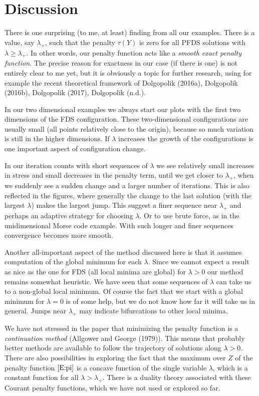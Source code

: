 \documentclass[
  12pt,
]{article}
\begin{document}
\section{Discussion}\label{discussion}

There is one surprising (to me, at least) finding from all our examples.
There is a value, say \(\lambda_+\), such that the penalty \(\tau(Y)\)
is zero for all PFDS solutions with \(\lambda\geq\lambda_+\). In other
words, our penalty function acts like a \emph{smooth exact penalty
function}. The precise reason for exactness in our case (if there is
one) is not entirely clear to me yet, but it is obviously a topic for
further research, using for example the recent theoretical framework of
Dolgopolik (2016a), Dolgopolik (2016b), Dolgopolik (2017), Dolgopolik
(n.d.).

In our two dimensional examples we always start our plots with the first
two dimensions of the FDS configuration. These two-dimensional
configurations are usually small (all points relatively close to the
origin), because so much variation is still in the higher dimensions. If
\(\lambda\) increases the growth of the configurations is one important
aspect of configuration change.

In our iteration counts with short sequences of \(\lambda\) we see
relatively small increases in stress and small decreases in the penalty
term, until we get closer to \(\lambda_+\), when we suddenly see a
sudden change and a larger number of iterations. This is also reflected
in the figures, where generally the change to the last solution (with
the largest \(\lambda\)) makes the largest jump. This suggest a finer
sequence near \(\lambda_+\) and perhaps an adaptive strategy for
choosing \(\lambda\). Or to use brute force, as in the unidimensional
Morse code example. With such longer and finer sequences convergence
becomes more smooth.

Another all-important aspect of the method discussed here is that it
assumes computation of the global minimum for each \(\lambda\). Since we
cannot expect a result as nice as the one for FDS (all local minima are
global) for \(\lambda>0\) our method remains somewhat heuristic. We have
seen that some sequences of \(\lambda\) can take us to a non-global
local minimum. Of course the fact that we start with a global minimum
for \(\lambda=0\) is of some help, but we do not know how far it will
take us in general. Jumps near \(\lambda_+\) may indicate bifurcations
to other local minima.

We have not stressed in the paper that minimizing the penalty function
is a \emph{continuation method} (Allgower and George (1979)). This means
that probably better methods are available to follow the trajectory of
solutions along \(\lambda>0\). There are also possibilities in exploring
the fact that the maximum over \(Z\) of the penalty function
\(\eqref{E:pi}\) is a concave function of the single variable
\(\lambda\), which is a constant function for all \(\lambda>\lambda_+\).
There is a duality theory associated with these Courant penalty
functions, which we have not used or explored so far.
\end{document}
